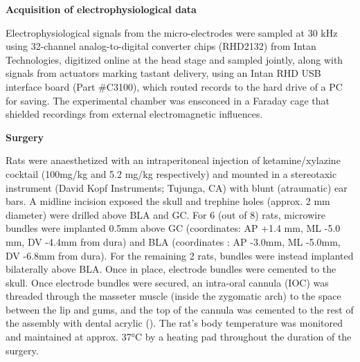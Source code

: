 \begin{refsection}
\smallskip
\noindent\textbf{Acquisition of electrophysiological data }\par
\noindent Electrophysiological signals from the micro-electrodes were sampled at 30 kHz using 32-channel analog-to-digital converter chips (RHD2132) from Intan Technologies, digitized online at the head stage and sampled jointly, along with signals from actuators marking tastant delivery, using an Intan RHD USB interface board (Part \#C3100), which routed records to the hard drive of a PC for saving. The experimental chamber was ensconced in a Faraday cage that shielded recordings from external electromagnetic influences.

\smallskip
\noindent\textbf{Surgery}\par
\noindent Rats were anaesthetized with an intraperitoneal injection of ketamine/xylazine cocktail (100mg/kg and 5.2 mg/kg respectively) and mounted in a stereotaxic instrument (David Kopf Instruments; Tujunga, CA) with blunt (atraumatic) ear bars. A midline incision exposed the skull and trephine holes (approx. 2 mm diameter) were drilled above BLA and GC. For 6 (out of 8) rats, microwire bundles were implanted 0.5mm above GC (coordinates: AP +1.4 mm, ML -5.0 mm, DV -4.4mm from dura) and BLA (coordinates : AP -3.0mm, ML -5.0mm, DV -6.8mm from dura). For the remaining 2 rats, bundles were instead implanted bilaterally above BLA. Once in place, electrode bundles were cemented to the skull. Once electrode bundles were secured, an intra-oral cannula (IOC) was threaded through the masseter muscle (inside the zygomatic arch) to the space between the lip and gums, and the top of the cannula was cemented to the rest of the assembly with dental acrylic (\cite{fontanini2006a}). The rat’s body temperature was monitored and maintained at approx. 37°C by a heating pad throughout the duration of the surgery.


\end{refsection}
